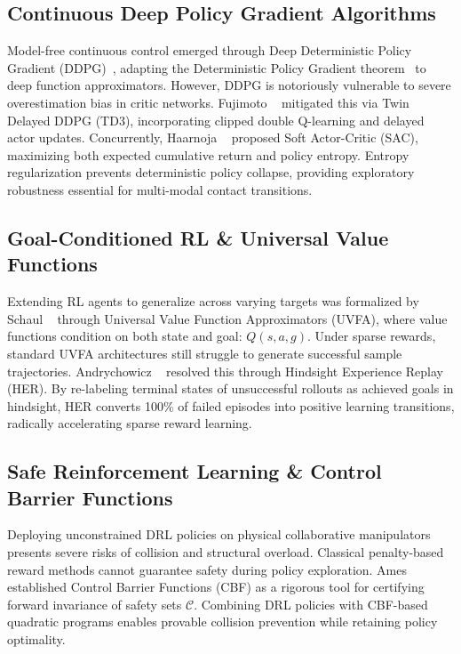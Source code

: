 \documentclass[10pt,twocolumn,a4paper]{article}
\begin{document}
\subsection{Continuous Deep Policy Gradient Algorithms}
Model-free continuous control emerged through Deep Deterministic Policy Gradient (DDPG)~\cite{lillicrap2016continuous}, adapting the Deterministic Policy Gradient theorem~\cite{silver2014deterministic} to deep function approximators. However, DDPG is notoriously vulnerable to severe overestimation bias in critic networks. Fujimoto \etal~\cite{fujimoto2018addressing} mitigated this via Twin Delayed DDPG (TD3), incorporating clipped double Q-learning and delayed actor updates. Concurrently, Haarnoja \etal~\cite{haarnoja2018soft} proposed Soft Actor-Critic (SAC), maximizing both expected cumulative return and policy entropy. Entropy regularization prevents deterministic policy collapse, providing exploratory robustness essential for multi-modal contact transitions.

\subsection{Goal-Conditioned RL \& Universal Value Functions}
Extending RL agents to generalize across varying targets was formalized by Schaul \etal~\cite{schaul2015universal} through Universal Value Function Approximators (UVFA), where value functions condition on both state and goal: $Q(s, a, g)$. Under sparse rewards, standard UVFA architectures still struggle to generate successful sample trajectories. Andrychowicz \etal~\cite{andrychowicz2017hindsight} resolved this through Hindsight Experience Replay (HER). By re-labeling terminal states of unsuccessful rollouts as achieved goals in hindsight, HER converts 100\% of failed episodes into positive learning transitions, radically accelerating sparse reward learning.

\subsection{Safe Reinforcement Learning \& Control Barrier Functions}
Deploying unconstrained DRL policies on physical collaborative manipulators presents severe risks of collision and structural overload. Classical penalty-based reward methods cannot guarantee safety during policy exploration. Ames \etal~\cite{ames2019control} established Control Barrier Functions (CBF) as a rigorous tool for certifying forward invariance of safety sets $\mathcal{C}$. Combining DRL policies with CBF-based quadratic programs enables provable collision prevention while retaining policy optimality.
\end{document}
